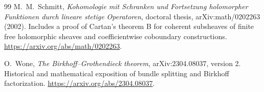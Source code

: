 \documentclass[11pt,letterpaper]{article}
\theoremstyle{definition}
\theoremstyle{remark}
\numberwithin{equation}{section}
\begin{document}
\begin{thebibliography}{99}
M.~M.~Schmitt,
\emph{Kohomologie mit Schranken und Fortsetzung holomorpher Funktionen durch lineare stetige Operatoren}, doctoral thesis, arXiv:math/0202263 (2002).
Includes a proof of Cartan's theorem B for coherent subsheaves of finite free holomorphic sheaves and coefficientwise coboundary constructions.
\url{https://arxiv.org/abs/math/0202263}.

O.~Wone, \emph{The Birkhoff--Grothendieck theorem}, arXiv:2304.08037, version 2.
Historical and mathematical exposition of bundle splitting and Birkhoff factorization.
\url{https://arxiv.org/abs/2304.08037}.

\end{thebibliography}
\end{document}
